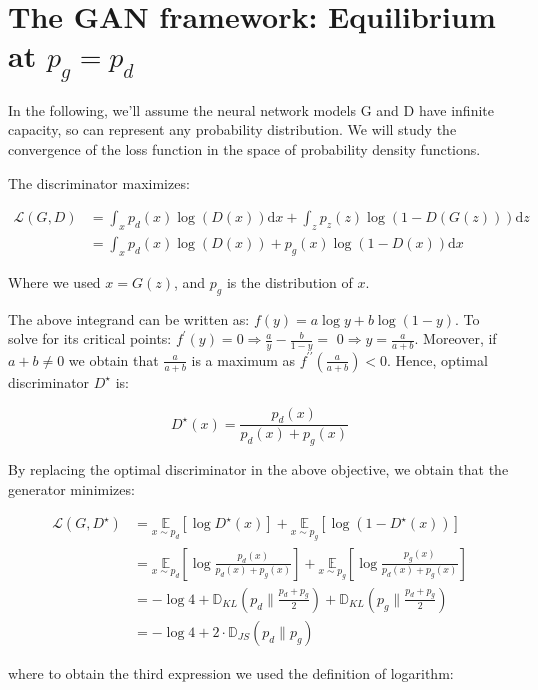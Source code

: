 \documentclass[10pt]{article}
\begin{document}
\section*{The GAN framework: 
 Equilibrium at $p_{g}=p_{d}$}
In the following, we'll assume the neural network models $\mathrm{G}$ and $\mathrm{D}$ have infinite capacity, so can represent any probability distribution. We will study the convergence of the loss function in the space of probability density functions.

The discriminator maximizes:

$$
\begin{aligned}
\mathcal{L}(G, D) & =\int_{x} p_{d}(x) \log (D(x)) \mathrm{d} x+\int_{z} p_{z}(z) \log (1-D(G(z))) \mathrm{d} z \\
& =\int_{x} p_{d}(x) \log (D(x))+p_{g}(x) \log (1-D(x)) \mathrm{d} x
\end{aligned}
$$

Where we used $x=G(z)$, and $p_{g}$ is the distribution of $x$.

The above integrand can be written as: $f(y)=a \log y+b \log (1-y)$. To solve for its critical points: $f^{\prime}(y)=0 \Rightarrow \frac{a}{y}-\frac{b}{1-y}=$ $0 \Rightarrow y=\frac{a}{a+b}$. Moreover, if $a+b \neq 0$ we obtain that $\frac{a}{a+b}$ is a maximum as $f^{\prime \prime}\left(\frac{a}{a+b}\right)<0$. Hence, optimal discriminator $D^{\star}$ is:

$$
D^{\star}(x)=\frac{p_{d}(x)}{p_{d}(x)+p_{g}(x)}
$$

By replacing the optimal discriminator in the above objective, we obtain that the generator minimizes:

$$
\begin{aligned}
\mathcal{L}\left(G, D^{\star}\right) & =\underset{x \sim p_{d}}{\mathbb{E}}\left[\log D^{\star}(x)\right]+\underset{x \sim p_{g}}{\mathbb{E}}\left[\log \left(1-D^{\star}(x)\right)\right] \\
& =\underset{x \sim p_{d}}{\mathbb{E}}\left[\log \frac{p_{d}(x)}{p_{d}(x)+p_{g}(x)}\right]+\underset{x \sim p_{g}}{\mathbb{E}}\left[\log \frac{p_{g}(x)}{p_{d}(x)+p_{g}(x)}\right] \\
& =-\log 4+\mathbb{D}_{K L}\left(p_{d} \| \frac{p_{d}+p_{g}}{2}\right)+\mathbb{D}_{K L}\left(p_{g} \| \frac{p_{d}+p_{g}}{2}\right) \\
& =-\log 4+2 \cdot \mathbb{D}_{J S}\left(p_{d} \| p_{g}\right)
\end{aligned}
$$

where to obtain the third expression we used the definition of logarithm:
\end{document}
